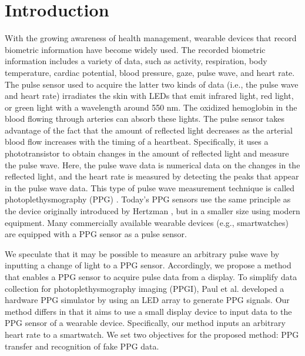 \documentclass[sigchi,authordraft]{acmart}
\begin{document}
\section{Introduction}
\label{sec:introduction}
With the growing awareness of health management, wearable devices that record biometric information have become widely used. The recorded biometric information includes a variety of data, such as activity, respiration, body temperature, cardiac potential, blood pressure, gaze, pulse wave, and heart rate. The pulse sensor used to acquire the latter two kinds of data (i.e., the pulse wave and heart rate) irradiates the skin with LEDs that emit infrared light, red light, or green light with a wavelength around 550 nm. The oxidized hemoglobin in the blood flowing through arteries can absorb these lights. The pulse sensor takes advantage of the fact that the amount of reflected light decreases as the arterial blood flow increases with the timing of a heartbeat. Specifically, it uses a phototransistor to obtain changes in the amount of reflected light and measure the pulse wave. Here, the pulse wave data is numerical data on the changes in the reflected light, and the heart rate is measured by detecting the peaks that appear in the pulse wave data. This type of pulse wave measurement technique is called photoplethysmography (PPG) \cite{ppg}. Today's PPG sensors use the same principle as the device originally introduced by Hertzman \cite{ppg_principle1, ppg_principle2}, but in a smaller size using modern equipment. Many commercially available wearable devices (e.g., smartwatches) are equipped with a PPG sensor as a pulse sensor.\par

We speculate that it may be possible to measure an arbitrary pulse wave by inputting a change of light to a PPG sensor. Accordingly, we propose a method that enables a PPG sensor to acquire pulse data from a display. To simplify data collection for photoplethysmography imaging (PPGI), Paul et al. \cite{ppg_generator} developed a hardware PPG simulator by using an LED array to generate PPG signals. Our method differs in that it aims to use a small display device to input data to the PPG sensor of a wearable device. Specifically, our method inputs an arbitrary heart rate to a smartwatch. We set two objectives for the proposed method: PPG transfer and recognition of fake PPG data.\par
\end{document}
